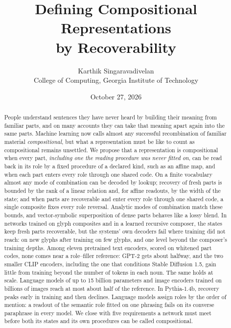 \documentclass[10pt]{article}
\title{Defining Compositional Representations\\ by Recoverability}
\author{Karthik Singaravadivelan\\ College of Computing, Georgia Institute of Technology}
\date{October 27, 2026}
\theoremstyle{plain}
\theoremstyle{remark}
\begin{document}
\maketitle

\begin{abstract}
People understand sentences they have never heard by building their meaning from familiar parts, and on many accounts they can take that meaning apart again into the same parts. Machine learning now calls almost any successful recombination of familiar material \emph{compositional}, but what a representation must be like to count as compositional remains unsettled. We propose that a representation is compositional when every part, \emph{including one the reading procedure was never fitted on}, can be read back in its role by a fixed procedure of a declared kind, such as an affine map, and when each part enters every role through one shared code. On a finite vocabulary almost any mode of combination can be decoded by lookup; recovery of fresh parts is bounded by the rank of a linear relation and, for affine readouts, by the width of the state; and when parts are recoverable and enter every role through one shared code, a single composite fixes every role reversal. Analytic modes of combination match these bounds, and vector-symbolic superposition of dense parts behaves like a lossy blend. In networks trained on glyph composites and in a learned recursive composer, the states keep fresh parts recoverable, but the systems' own decoders fail where training did not reach: on new glyphs after training on few glyphs, and one level beyond the composer's training depths. Among eleven pretrained text encoders, scored on whitened part codes, none comes near a role--filler reference: GPT-2 gets about halfway, and the two smaller CLIP encoders, including the one that conditions Stable Diffusion 1.5, gain little from training beyond the number of tokens in each noun. The same holds at scale. Language models of up to 15 billion parameters and image encoders trained on billions of images reach at most about half of the reference. In Pythia-1.4b, recovery peaks early in training and then declines. Language models assign roles by the order of mention: a readout of the semantic role fitted on one phrasing fails on its converse paraphrase in every model. We close with five requirements a network must meet before both its states and its own procedures can be called compositional.
\end{abstract}

\end{document}
